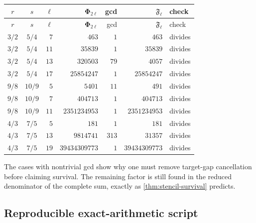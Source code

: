 \documentclass[11pt]{article}
\theoremstyle{definition}
\newcommand{\PhiHom}{\boldsymbol\Phi}
\begin{document}
\begin{center}
\small
\begin{longtable}{@{}ccrrrrl@{}}
\toprule
$r$ & $s$ & $\ell$ & $\PhiHom_{2\ell}$ & gcd & $\mathfrak F_\ell$ & check\\
\midrule
\endfirsthead
\toprule
$r$ & $s$ & $\ell$ & $\PhiHom_{2\ell}$ & gcd & $\mathfrak F_\ell$ & check\\
\midrule
\endhead
$3/2$ & $5/4$ & $7$  & $463$       & $1$  & $463$       & divides\\
$3/2$ & $5/4$ & $11$ & $35839$     & $1$  & $35839$     & divides\\
$3/2$ & $5/4$ & $13$ & $320503$    & $79$ & $4057$      & divides\\
$3/2$ & $5/4$ & $17$ & $25854247$  & $1$  & $25854247$  & divides\\
$9/8$ & $10/9$& $5$  & $5401$      & $11$ & $491$       & divides\\
$9/8$ & $10/9$& $7$  & $404713$    & $1$  & $404713$    & divides\\
$9/8$ & $10/9$& $11$ & $2351234953$& $1$  & $2351234953$& divides\\
$4/3$ & $7/5$ & $5$  & $181$       & $1$  & $181$       & divides\\
$4/3$ & $7/5$ & $13$ & $9814741$   & $313$& $31357$     & divides\\
$4/3$ & $7/5$ & $19$ & $39434309773$&$1$ & $39434309773$& divides\\
\bottomrule
\end{longtable}
\end{center}

The cases with nontrivial gcd show why one must remove target-gap
cancellation before claiming survival.  The remaining factor is still found
in the reduced denominator of the complete sum, exactly as
\cref{thm:stencil-survival} predicts.

\subsection{Reproducible exact-arithmetic script}
\end{document}
